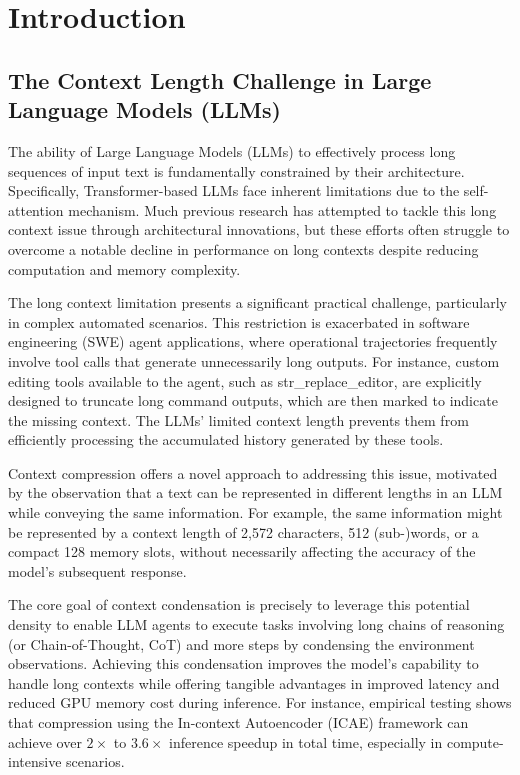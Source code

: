 \chapter{Introduction}


\section{The Context Length Challenge in Large Language Models (LLMs)}

The ability of Large Language Models (LLMs) to effectively process long sequences of input text is fundamentally constrained by their architecture. Specifically, Transformer-based LLMs face inherent limitations due to the self-attention mechanism. Much previous research has attempted to tackle this long context issue through architectural innovations, but these efforts often struggle to overcome a notable decline in performance on long contexts despite reducing computation and memory complexity.

The long context limitation presents a significant practical challenge, particularly in complex automated scenarios. This restriction is exacerbated in software engineering (SWE) agent applications, where operational trajectories frequently involve tool calls that generate unnecessarily long outputs. For instance, custom editing tools available to the agent, such as str\_replace\_editor, are explicitly designed to truncate long command outputs, which are then marked to indicate the missing context. The LLMs' limited context length prevents them from efficiently processing the accumulated history generated by these tools.

Context compression offers a novel approach to addressing this issue, motivated by the observation that a text can be represented in different lengths in an LLM while conveying the same information. For example, the same information might be represented by a context length of 2,572 characters, 512 (sub-)words, or a compact 128 memory slots, without necessarily affecting the accuracy of the model's subsequent response.

The core goal of context condensation is precisely to leverage this potential density to enable LLM agents to execute tasks involving long chains of reasoning (or Chain-of-Thought, CoT) and more steps by condensing the environment observations. Achieving this condensation improves the model's capability to handle long contexts while offering tangible advantages in improved latency and reduced GPU memory cost during inference. For instance, empirical testing shows that compression using the In-context Autoencoder (ICAE) framework can achieve over $2\times$ to $3.6\times$ inference speedup in total time, especially in compute-intensive scenarios.


